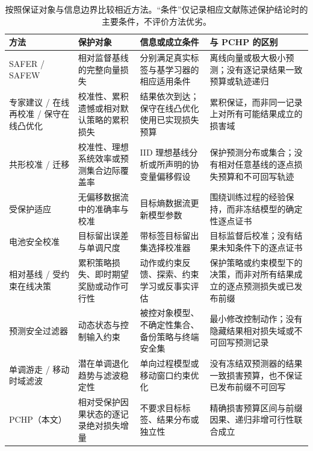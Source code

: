 \documentclass[UTF8,11pt]{ctexart}
\begin{document}
\begin{table}[H]
  \centering
  \caption{按照保证对象与信息边界比较相近方法。“条件”仅记录相应文献陈述保护结论时的主要条件，不评价方法优劣。}
  \label{tab:novelty_audit_zh}
  \footnotesize
  \renewcommand{\arraystretch}{0.96}
  \begin{tabularx}{\textwidth}{@{}>{\raggedright\arraybackslash}p{}>{\raggedright\arraybackslash}p{}>{\raggedright\arraybackslash}p{}>{\raggedright\arraybackslash}X@{}}
    \toprule
    方法 & 保护对象 & 信息或成立条件 & 与 PCHP 的区别 \\
    \midrule
    SAFER / SAFEW \citep{li2017safer,li2021safeweak} & 相对监督基线的完整向量损失 & 分别满足真实标签与基学习器的相应适用条件 & 离线向量或极大极小预测；没有逐记录结果一致预算或轨迹递归 \\
    专家建议 / 在线再校准 / 保守在线凸优化 \citep{chernov2009evaluators,marx2025calibrated,deshpande2025calibrated,bernasconi2021conservative} & 校准性、累积遗憾或相对默认策略的累积损失 & 结果依次到达；保守在线凸优化使用已实现损失预算 & 累积保证，而非同一记录上对所有可能结果成立的损害域 \\
    共形校准 / 迁移 \citep{vovk2020conformal,tuwani2023transport,filgueira2026conformalized} & 校准性、理想系统效率或预测集合边际覆盖率 & IID 理想基线分析或所声明的协变量偏移假设 & 保护预测分布或集合；没有相对任意基线的逐点损失预算和不可回写轨迹 \\
    受保护适应 \citep{bar2024protected} & 无偏移数据流中的准确率与校准 & 目标熵数据流更新模型参数 & 围绕训练过程的经验保持，而非冻结模型的确定性逐点证书 \\
    电池安全校准 \citep{nyachionjeka2026safecalibrated} & 目标留出误差与单调尺度 & 带标签目标留出集选择校准器 & 目标监督后校准；没有结果未知条件下的逐点证书 \\
    相对基线 / 受约束在线决策 \citep{moradipari2020stagewise,deb2025conservative,sridharan2025unknown,vaskov2024donoharm} & 累积策略损失、即时期望奖励或动作可行性 & 动作或约束反馈、探索、约束学习或反事实评估 & 保护策略或约束模型下的决策，而非对所有结果成立的逐点预测损失或已发布前缀 \\
    预测安全过滤器 \citep{wabersich2021predictive} & 动态状态与控制输入约束 & 被控对象模型、不确定性集合、备份策略与终端安全集 & 最小修改控制动作；没有隐藏结果相对损失域或不可回写预测记录 \\
    单调游走 / 移动时域滤波 \citep{samar2004moving,gorinevsky2008efficient} & 潜在单调退化趋势与滤波稳定性 & 单向过程模型或移动窗口约束优化 & 没有冻结双预测器的结果一致损害预算，也不保证已发布前缀不可回写 \\
    PCHP（本文） & 相对受保护因果状态的逐记录绝对损失增量 & 不要求目标标签、结果分布或独立性 & 精确损害预算区间与前缀因果、递归非增可行性联合成立 \\
    \bottomrule
  \end{tabularx}
\end{table}
\end{document}
